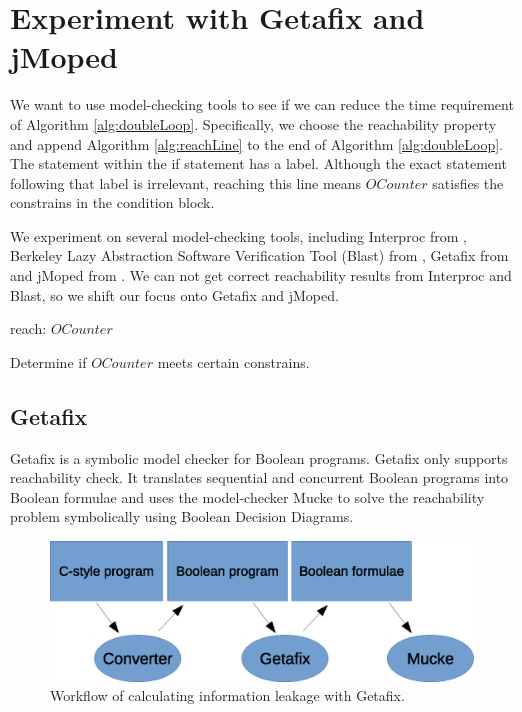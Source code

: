 \chapter{Experiment with Getafix and jMoped}
	\label{CH_04}

We want to use model-checking tools to see if we can reduce the time requirement of Algorithm \ref{alg:doubleLoop}. Specifically, we choose the reachability property and append Algorithm \ref{alg:reachLine} to the end of Algorithm \ref{alg:doubleLoop}. The statement within the if statement has a label. Although the exact statement following that label is irrelevant, reaching this line means $OCounter$ satisfies the constrains in the condition block.

We experiment on several model-checking tools, including Interproc from \cite{_interproc_2011}, Berkeley Lazy Abstraction Software Verification Tool (Blast) from \cite{_mtc_2008}, Getafix from \cite{getafix} and jMoped from \cite{moped}. We can not get correct reachability results from Interproc and Blast, so we shift our focus onto Getafix and jMoped.

\renewcommand{\algorithmiccomment}[1]{// #1}
\begin{algorithm}
\begin{algorithmic}

\STATE reach: $OCounter$
\ENDIF

\end{algorithmic}

\caption[Single loop]{Determine if $OCounter$ meets certain constrains.}
\label{alg:reachLine}
\end{algorithm}

\section{Getafix}
Getafix is a symbolic model checker for Boolean programs. Getafix only supports reachability check. It translates sequential and concurrent Boolean programs into Boolean formulae and uses the model-checker Mucke to solve the reachability problem symbolically using Boolean Decision Diagrams. 

\begin{figure}
\centering
\includegraphics[scale=0.8]{Figures/workFlow}
\caption{Workflow of calculating information leakage with Getafix.}
\label{fig:workFlow}
\end{figure}

